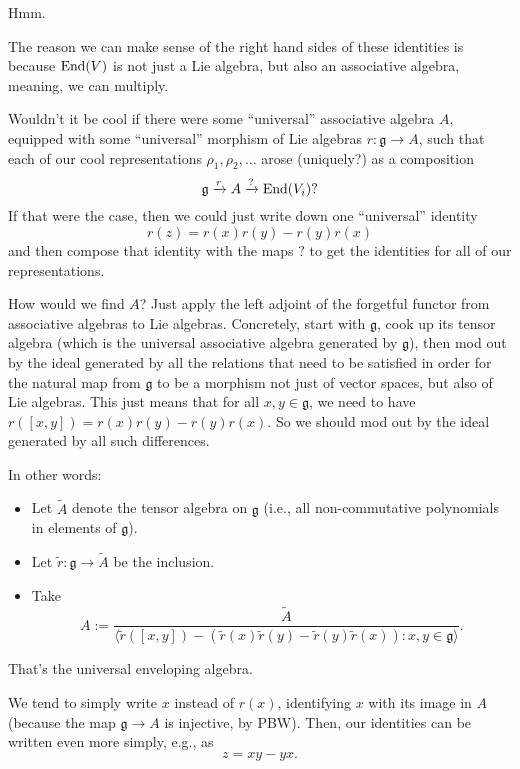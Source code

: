 \documentclass[reqno]{amsart} 
\begin{document}
Hmm. 🤔

The reason we can make sense of the right hand sides of these identities is because $\operatorname{End}(V)$ is not just a Lie algebra, but also an associative algebra, meaning, we can multiply.

Wouldn't it be cool if there were some ``universal'' associative algebra $A$, equipped with some ``universal'' morphism of Lie algebras $r : \mathfrak{g} \rightarrow A$, such that each of our cool representations $\rho_1, \rho_2, \dotsc$ arose (uniquely?) as a composition
\begin{equation*}
  \mathfrak{g} \xrightarrow{r} A \xrightarrow{?} \operatorname{End}(V_i)?
\end{equation*}
If that were the case, then we could just write down one ``universal'' identity
\begin{equation*}
  r(z) = r(x) r(y) - r(y) r(x)
\end{equation*}
and then compose that identity with the maps $?$ to get the identities for all of our representations.

How would we find $A$?  Just apply the left adjoint of the forgetful functor from associative algebras to Lie algebras.  Concretely, start with $\mathfrak{g}$, cook up its tensor algebra (which is the universal associative algebra generated by $\mathfrak{g}$), then mod out by the ideal generated by all the relations that need to be satisfied in order for the natural map from $\mathfrak{g}$ to be a morphism not just of vector spaces, but also of Lie algebras.  This just means that for all $x, y \in \mathfrak{g}$, we need to have $r([x,y]) = r(x) r(y) - r(y) r(x)$.  So we should mod out by the ideal generated by all such differences.

In other words:
\begin{itemize}
\item Let $\tilde{A}$ denote the tensor algebra on $\mathfrak{g}$ (i.e., all non-commutative polynomials in elements of $\mathfrak{g}$).
\item Let $\tilde{r} : \mathfrak{g} \rightarrow \tilde{A}$ be the inclusion.
\item Take
  \begin{equation*}
    A := \frac{\tilde{A}}{\langle \tilde{r}([x,y]) - (\tilde{r}(x)\tilde{r}(y) - \tilde{r}(y)\tilde{r}(x)) : x, y \in \mathfrak{g} \rangle}.
  \end{equation*}
\end{itemize}
That's the universal enveloping algebra.

We tend to simply write $x$ instead of $r(x)$, identifying $x$ with its image in $A$ (because the map $\mathfrak{g} \rightarrow A$ is injective, by PBW).  Then, our identities can be written even more simply, e.g., as
\begin{equation*}
  z = x y - y x.
\end{equation*}
\end{document}
